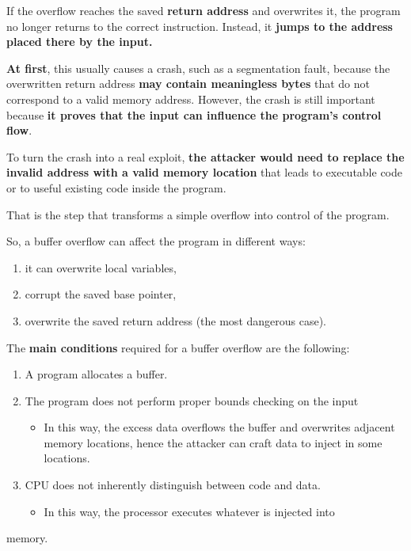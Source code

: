 \documentclass{article}
\begin{document}
If the overflow reaches the saved \textbf{return address} and overwrites it, the program no longer returns to the correct instruction. Instead, it \textbf{jumps to the address placed there by the input.}

\textbf{At first}, this usually causes a crash, such as a segmentation fault, because the overwritten return address \textbf{may contain meaningless bytes} that do not correspond to a valid memory address. However, the crash is still important because \textbf{it proves that the input can influence the program's control flow}.

To turn the crash into a real exploit, \textbf{the attacker would need to replace the invalid address with a valid memory location} that leads to executable code or to useful existing code inside the program.

That is the step that transforms a simple overflow into control of the program.

So, a buffer overflow can affect the program in different ways:

\begin{enumerate}
\item it can overwrite local variables,
\item corrupt the saved base pointer,
\item overwrite the saved return address (the most dangerous case).
\end{enumerate}

The \textbf{main conditions} required for a buffer overflow are the following:

\begin{enumerate}
\item A program allocates a buffer.
\item The program does not perform proper bounds checking on the input
\begin{itemize}
\item In this way, the excess data overflows the buffer and overwrites adjacent memory locations, hence the attacker can craft data to inject in some locations.
\end{itemize}
\item CPU does not inherently distinguish between code and data.
\begin{itemize}
\item In this way, the processor executes whatever is injected into
\end{itemize}
\end{enumerate}
memory.
\end{document}
